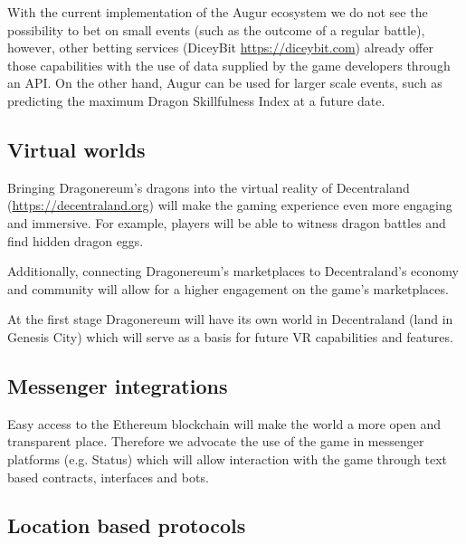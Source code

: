 \documentclass[12pt]{article}
\begin{document}
With the current implementation of the Augur ecosystem we do not see the possibility to bet on small events (such as the outcome of a regular battle), however, other betting services (DiceyBit \url{https://diceybit.com}) already offer those capabilities with the use of data supplied by the game developers through an API. On the other hand, Augur can be used for larger scale events, such as predicting the maximum Dragon Skillfulness Index at a future date.\par


\vspace{\baselineskip}
 \subsection{Virtual worlds}\label{Virtual worlds} \par

Bringing Dragonereum’s dragons into the virtual reality of Decentraland (\url{https://decentraland.org}) will make the gaming experience even more engaging and immersive. For example, players will be able to witness dragon battles and find hidden dragon eggs. \par

Additionally, connecting Dragonereum’s marketplaces to Decentraland’s economy and community will allow for a higher engagement on the game’s marketplaces.\par

At the first stage Dragonereum will have its own world in Decentraland (land in Genesis City) which will serve as a basis for future VR capabilities and features.\par


\vspace{\baselineskip}
 \subsection{Messenger integrations}\label{Messenger integrations} \par

Easy access to the Ethereum blockchain will make the world a more open and transparent place. Therefore we advocate the use of the game in messenger platforms (e.g. Status) which will allow interaction with the game through text based contracts, interfaces and bots.\par


\vspace{\baselineskip}
 \subsection{Location based protocols}\label{Location based protocols} \par
\end{document}
